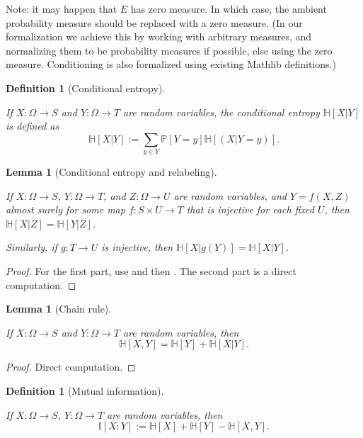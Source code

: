 \documentclass[10pt,a4paper]{article}
\newtheorem{lemma}[theorem]{Lemma}
\newtheorem{definition}[theorem]{Definition}
\newcommand{\lean}[1]{}
\newcommand{\uses}[1]{}
\newcommand{\leanok}{}
\newcommand{\bbH}{\mathbb{H}}
\newcommand{\bbP}{\mathbb{P}}
\newcommand{\bbI}{\mathbb{I}}
\begin{document}
Note: it may happen that $E$ has zero measure.  In which case, the ambient probability measure should be replaced with a zero measure.  (In our formalization we achieve this by working with arbitrary measures, and normalizing them to be probability measures if possible, else using the zero measure.  Conditioning is also formalized using existing Mathlib definitions.)

\begin{definition}[Conditional entropy]
  \label{conditional-entropy-def}
  \uses{entropy-def,condition-event-def}
  \lean{ProbabilityTheory.condEntropy}
  \leanok
  If $X: \Omega \to S$ and $Y: \Omega \to T$ are random variables, the conditional entropy $\bbH[X|Y]$ is defined as
  $$ \bbH[X|Y] := \sum_{y \in Y} \bbP[Y = y] \bbH[(X | Y=y)].$$
\end{definition}

\begin{lemma}[Conditional entropy and relabeling]\label{relabeled-entropy-cond}
  \uses{conditional-entropy-def}
  \lean{ProbabilityTheory.condEntropy_comp_of_injective, ProbabilityTheory.condEntropy_of_injective'}\leanok
  If $X: \Omega \to S$, $Y: \Omega \to T$, and $Z: \Omega \to U$ are random variables, and $Y = f(X,Z)$ almost surely for some map $f: S \times U \to T$ that is injective for each fixed $U$, then $\bbH[X|Z] = \bbH[Y|Z]$.

  Similarly, if $g: T \to U$ is injective, then $\bbH[X|g(Y)] = \bbH[X|Y]$.
\end{lemma}

\begin{proof}
  \uses{relabeled-entropy}\leanok
  For the first part, use  and then .  The second part is a direct computation.
\end{proof}


\begin{lemma}[Chain rule]\label{chain-rule}
  \uses{conditional-entropy-def}
  \lean{ProbabilityTheory.chain_rule, ProbabilityTheory.chain_rule'}
  \leanok
  If $X: \Omega \to S$ and $Y: \Omega \to T$ are random variables, then
  $$ \bbH[X, Y] = \bbH[Y] + \bbH[X|Y].$$
  \end{lemma}
  \begin{proof}
  \leanok
  Direct computation.
\end{proof}


\begin{definition}[Mutual information]
  \label{information-def}
  \uses{entropy-def}
  \lean{ProbabilityTheory.mutualInfo, ProbabilityTheory.mutualInfo_def}
  \leanok
  If $X: \Omega \to S$, $Y: \Omega \to T$ are random variables, then
  $$\bbI[X : Y] := \bbH[X] + \bbH[Y] - \bbH[X,Y].$$
\end{definition}
\end{document}
